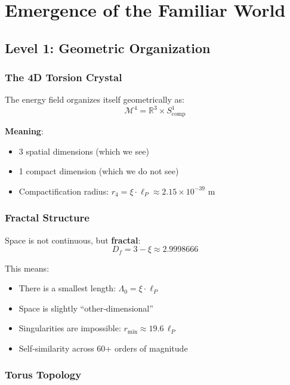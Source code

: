	\section{Emergence of the Familiar World}

	\subsection{Level 1: Geometric Organization}

	\subsubsection{The 4D Torsion Crystal}

	The energy field organizes itself geometrically as:
	\begin{equation}
		\mathcal{M}^4 = \mathbb{R}^3 \times S^1_{\text{comp}}
	\end{equation}

	\textbf{Meaning}:
	\begin{itemize}
		\item 3 spatial dimensions (which we see)
		\item 1 compact dimension (which we do not see)
		\item Compactification radius: $r_4 = \xi \cdot \ell_P \approx 2.15 \times 10^{-39}$ m
	\end{itemize}

	\subsubsection{Fractal Structure}

	Space is not continuous, but \textbf{fractal}:
	\begin{equation}
		D_f = 3 - \xi \approx 2.9998666
	\end{equation}

	This means:
	\begin{itemize}
		\item There is a smallest length: $\Lambda_0 = \xi \cdot \ell_P$
		\item Space is slightly \enquote{other‑dimensional}
		\item Singularities are impossible: $r_{\min} \approx 19.6\,\ell_P$
		\item Self‑similarity across 60+ orders of magnitude
	\end{itemize}

	\subsubsection{Torus Topology}

